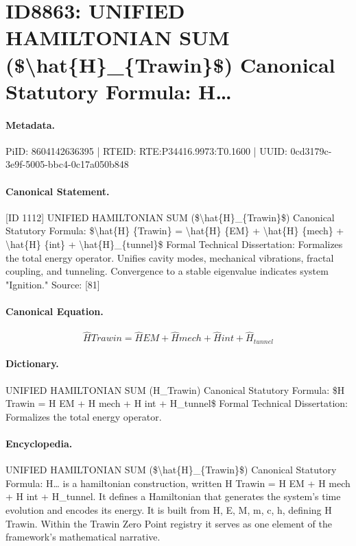 \section*{ID8863: UNIFIED HAMILTONIAN SUM (\$\textbackslash{}hat\{H\}\_\{Trawin\}\$) Canonical Statutory Formula: H…}
\paragraph{Metadata.}
PiID: 8604142636395 | RTEID: RTE:P34416.9973:T0.1600 | UUID: 0cd3179c-3e9f-5005-bbc4-0c17a050b848

\paragraph{Canonical Statement.}
[ID 1112] UNIFIED HAMILTONIAN SUM (\$\textbackslash{}hat\{H\}\_\{Trawin\}\$) Canonical Statutory Formula: \$\textbackslash{}hat\{H\} \{Trawin\} = \textbackslash{}hat\{H\} \{EM\} + \textbackslash{}hat\{H\} \{mech\} + \textbackslash{}hat\{H\} \{int\} + \textbackslash{}hat\{H\}\_\{tunnel\}\$ Formal Technical Dissertation: Formalizes the total energy operator. Unifies cavity modes, mechanical vibrations, fractal coupling, and tunneling. Convergence to a stable eigenvalue indicates system "Ignition." Source: [81]

\paragraph{Canonical Equation.}
\[
\hat{H} {Trawin} = \hat{H} {EM} + \hat{H} {mech} + \hat{H} {int} + \hat{H}_{tunnel}
\]

\paragraph{Dictionary.}
UNIFIED HAMILTONIAN SUM (H\_Trawin) Canonical Statutory Formula: \$H Trawin = H EM + H mech + H int + H\_tunnel\$ Formal Technical Dissertation: Formalizes the total energy operator.

\paragraph{Encyclopedia.}
UNIFIED HAMILTONIAN SUM (\$\textbackslash{}hat\{H\}\_\{Trawin\}\$) Canonical Statutory Formula: H… is a hamiltonian construction, written H Trawin = H EM + H mech + H int + H\_tunnel. It defines a Hamiltonian that generates the system's time evolution and encodes its energy. It is built from H, E, M, m, c, h, defining H Trawin. Within the Trawin Zero Point registry it serves as one element of the framework's mathematical narrative.

